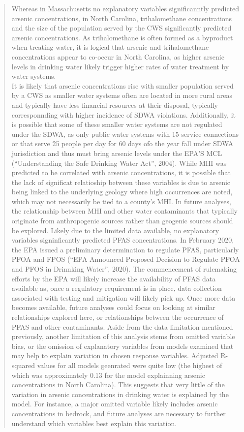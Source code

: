 \documentclass[12pt,]{article}
\begin{document}
\begin{quote}
Whereas in Massachusetts no explanatory variables significanntly
predicted arsenic concentrations, in North Carolina, trihalomethane
concentrations and the size of the population served by the CWS
significantly predicted arsenic concentrations. As trihalomethane is
often formed as a byproduct when treating water, it is logical that
arsenic and trihalomethane concentrations appear to co-occur in North
Carolina, as higher arsenic levels in drinking water likely trigger
higher rates of water treatment by water systems.\\
It is likely that arsenic concentrations rise with smaller population
served by a CWS as smaller water systems often are located in more rural
areas and typically have less financial resources at their disposal,
typically corresponnding with higher incidence of SDWA violations.
Additionally, it is possible that some of these smaller water systems
are not regulated under the SDWA, as only public water systems with 15
service connections or that serve 25 people per day for 60 days ofo the
year fall under SDWA jurisdiction and thus must bring arsenic levels
under the EPA'S MCL (``Understanding the Safe Drinking Water Act'',
2004). While MHI was predicted to be correlated with arsenic
concentrations, it is possible that the lack of significat relatioship
between these variables is due to arsenic being linked to the underlying
geology where high occurrences are noted, which may not necessarily be
tied to a county's MHI. In future analyses, the relationship between MHI
and other water contaminants that typically originate from anthropogenic
sources rather than geogenic sources should be explored. Likely due to
the limited data available, no explanatory variables signinficantly
predicted PFAS concentrations. In February 2020, the EPA issued a
preliminary determination to regulate PFAS, particularly PFOA and FPOS
(``EPA Announced Proposed Decision to Regulate PFOA and PFOS in
Drinnking Water'', 2020). The commencement of rulemaking efforts by the
EPA will likely increase the availability of PFAS data available as,
once a regulatory requirement is in place, data collection associated
with testing and mitigation will likely pick up. Once more data becomes
available, future analyses could focus on looking at similar
relationships explored here, or relationships between the occurrence of
PFAS and other contaminants. Aside from the data limitation mentioned
previously, another limitation of this analysis stems from omitted
variable bias, or the omission of explanatory variables from models
examined that may help to explain variation in chosen response
variables. Adjusted R-squared values for all models geenrated were quite
low (the highest of which was approximately 0.13 for the model
explainning arsenic concentrations in North Carolina). This suggests
that very little of the variation in arsenic concentrations in drinking
water is explained by the model. For instance, a major omitted variable
likely includes arsenic concentrations in bedrock, and future analyses
are necessary to further understand which variables best explain this
variation.
\end{quote}
\end{document}
